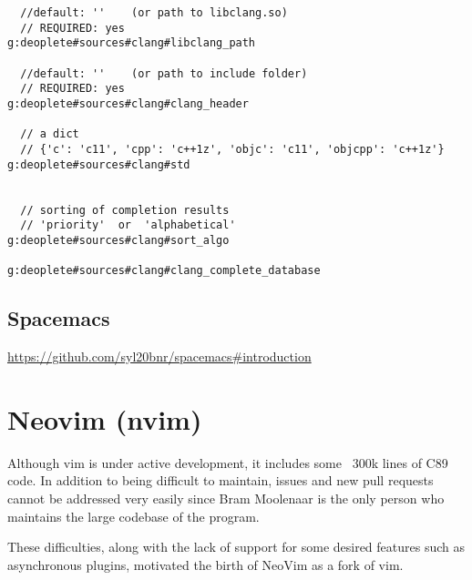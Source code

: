 \begin{verbatim}  
  //default: ''    (or path to libclang.so)
  // REQUIRED: yes
g:deoplete#sources#clang#libclang_path

  //default: ''    (or path to include folder)
  // REQUIRED: yes
g:deoplete#sources#clang#clang_header

  // a dict 
  // {'c': 'c11', 'cpp': 'c++1z', 'objc': 'c11', 'objcpp': 'c++1z'}
g:deoplete#sources#clang#std

  
  // sorting of completion results
  // 'priority'  or  'alphabetical'
g:deoplete#sources#clang#sort_algo

g:deoplete#sources#clang#clang_complete_database
\end{verbatim}



\section{Spacemacs}

\url{https://github.com/syl20bnr/spacemacs#introduction}

\chapter{Neovim (nvim)}
\label{chap:neovim}
\label{sec:neovim}

\begin{mdframed}
Although vim is under active development, it includes some ~300k lines of C89
code. In addition to being difficult to maintain, issues and new pull requests
cannot be addressed very easily since Bram Moolenaar is the only person who
maintains the large codebase of the program.  

These difficulties, along with the lack of support for some desired features
such as asynchronous plugins, motivated the birth of NeoVim as a fork of vim.
\end{mdframed}

